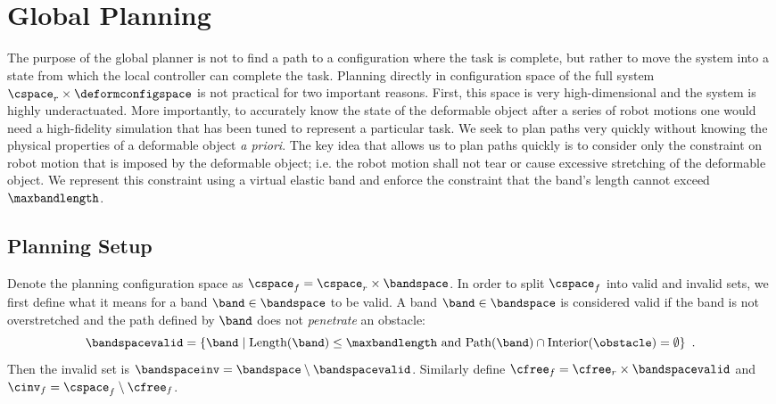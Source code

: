 \section{Global Planning}
\label{sec:global_planning}

The purpose of the global planner is not to find a path to a configuration where the task is complete, but rather to move the system into a state from which the local controller can complete the task. Planning directly in configuration space of the full system $\cspace_r \times \deformconfigspace$ is not practical for two important reasons. First, this space is very high-dimensional and the system is highly underactuated. More importantly, to accurately know the state of the deformable object after a series of robot motions one would need a high-fidelity simulation that has been tuned to represent a particular task. We seek to plan paths very quickly without knowing the physical properties of a deformable object \textit{a priori}. The key idea that allows us to plan paths quickly is to consider only the constraint on robot motion that is imposed by the deformable object; i.e. the robot motion shall not tear or cause excessive stretching of the deformable object. We represent this constraint using a virtual elastic band and enforce the constraint that the band's length cannot exceed $\maxbandlength$.


\subsection{Planning Setup}


Denote the planning configuration space as $\cspace_f = \cspace_r \times \bandspace$. In order to split $\cspace_f$ into valid and invalid sets, we first define what it means for a band $\band \in \bandspace$ to be valid. A band $\band \in \bandspace$ is considered valid if the band is not overstretched and the path defined by $\band$ does not \textit{penetrate} an obstacle:
\begin{equation}
    \bandspacevalid = \{ \band \mid \textrm{Length}(\band) \leq \maxbandlength \textrm{ and } 
                                    \textrm{Path(\band)} \cap \textrm{Interior}(\obstacle) = \emptyset \} \enspace .
\end{equation}
Then the invalid set is $\bandspaceinv = \bandspace \setminus \bandspacevalid$. Similarly define $\cfree_f = \cfree_r \times \bandspacevalid$ and $\cinv_f = \cspace_f \setminus \cfree_f$.





